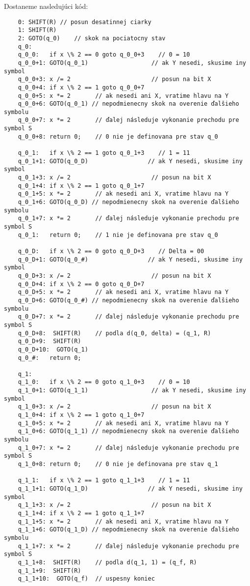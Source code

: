 \documentclass[10pt]{article}
\begin{document}
    Dostaneme nasledujúci kód:
    \footnotesize \begin{verbatim}
    0: SHIFT(R) // posun desatinnej ciarky
    1: SHIFT(R) 
    2: GOTO(q_0)    // skok na pociatocny stav
    q_0:
    q_0_0:   if x \% 2 == 0 goto q_0_0+3    // 0 = 10
    q_0_0+1: GOTO(q_0_1)                  // ak Y nesedi, skusime iny symbol 
    q_0_0+3: x /= 2                       // posun na bit X
    q_0_0+4: if x \% 2 == 1 goto q_0_0+7 
    q_0_0+5: x *= 2       // ak nesedi ani X, vratime hlavu na Y
    q_0_0+6: GOTO(q_0_1) // nepodmienecny skok na overenie ďalšieho symbolu
    q_0_0+7: x *= 2       // ďalej následuje vykonanie prechodu pre symbol S
    q_0_0+8: return 0;    // 0 nie je definovana pre stav q_0

    q_0_1:   if x \% 2 == 1 goto q_0_1+3    // 1 = 11
    q_0_1+1: GOTO(q_0_D)                 // ak Y nesedi, skusime iny symbol 
    q_0_1+3: x /= 2                       // posun na bit X
    q_0_1+4: if x \% 2 == 1 goto q_0_1+7 
    q_0_1+5: x *= 2       // ak nesedi ani X, vratime hlavu na Y
    q_0_1+6: GOTO(q_0_D) // nepodmienecny skok na overenie ďalšieho symbolu
    q_0_1+7: x *= 2       // ďalej následuje vykonanie prechodu pre symbol S
    q_0_1:   return 0;    // 1 nie je definovana pre stav q_0

    q_0_D:   if x \% 2 == 0 goto q_0_D+3    // Delta = 00
    q_0_D+1: GOTO(q_0_#)                 // ak Y nesedi, skusime iny symbol 
    q_0_D+3: x /= 2                       // posun na bit X
    q_0_D+4: if x \% 2 == 0 goto q_0_D+7 
    q_0_D+5: x *= 2       // ak nesedi ani X, vratime hlavu na Y
    q_0_D+6: GOTO(q_0_#) // nepodmienecny skok na overenie ďalšieho symbolu
    q_0_D+7: x *= 2       // ďalej následuje vykonanie prechodu pre symbol S
    q_0_D+8:  SHIFT(R)    // podla d(q_0, delta) = (q_1, R) 
    q_0_D+9:  SHIFT(R)  
    q_0_D+10:  GOTO(q_1) 
    q_0_#:   return 0;

    q_1:
    q_1_0:   if x \% 2 == 0 goto q_1_0+3    // 0 = 10
    q_1_0+1: GOTO(q_1_1)                  // ak Y nesedi, skusime iny symbol 
    q_1_0+3: x /= 2                       // posun na bit X
    q_1_0+4: if x \% 2 == 1 goto q_1_0+7 
    q_1_0+5: x *= 2       // ak nesedi ani X, vratime hlavu na Y
    q_1_0+6: GOTO(q_1_1) // nepodmienecny skok na overenie ďalšieho symbolu
    q_1_0+7: x *= 2       // ďalej následuje vykonanie prechodu pre symbol S
    q_1_0+8: return 0;    // 0 nie je definovana pre stav q_1

    q_1_1:   if x \% 2 == 1 goto q_1_1+3    // 1 = 11
    q_1_1+1: GOTO(q_1_D)                 // ak Y nesedi, skusime iny symbol 
    q_1_1+3: x /= 2                       // posun na bit X
    q_1_1+4: if x \% 2 == 1 goto q_1_1+7 
    q_1_1+5: x *= 2       // ak nesedi ani X, vratime hlavu na Y
    q_1_1+6: GOTO(q_1_D) // nepodmienecny skok na overenie ďalšieho symbolu
    q_1_1+7: x *= 2       // ďalej následuje vykonanie prechodu pre symbol S
    q_1_1+8:  SHIFT(R)    // podla d(q_1, 1) = (q_f, R) 
    q_1_1+9:  SHIFT(R)  
    q_1_1+10:  GOTO(q_f)  // uspesny koniec
 

\end{verbatim}
\end{document}
